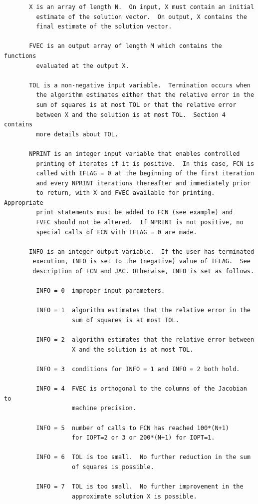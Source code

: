 \documentclass[11pt,twoside]{article}
\begin{document}
\begin{verbatim}
       X is an array of length N.  On input, X must contain an initial
         estimate of the solution vector.  On output, X contains the
         final estimate of the solution vector.

       FVEC is an output array of length M which contains the functions
         evaluated at the output X.

       TOL is a non-negative input variable.  Termination occurs when
         the algorithm estimates either that the relative error in the
         sum of squares is at most TOL or that the relative error
         between X and the solution is at most TOL.  Section 4 contains
         more details about TOL.

       NPRINT is an integer input variable that enables controlled
         printing of iterates if it is positive.  In this case, FCN is
         called with IFLAG = 0 at the beginning of the first iteration
         and every NPRINT iterations thereafter and immediately prior
         to return, with X and FVEC available for printing. Appropriate
         print statements must be added to FCN (see example) and
         FVEC should not be altered.  If NPRINT is not positive, no
         special calls of FCN with IFLAG = 0 are made.

       INFO is an integer output variable.  If the user has terminated
        execution, INFO is set to the (negative) value of IFLAG.  See
        description of FCN and JAC. Otherwise, INFO is set as follows.

         INFO = 0  improper input parameters.

         INFO = 1  algorithm estimates that the relative error in the
                   sum of squares is at most TOL.

         INFO = 2  algorithm estimates that the relative error between
                   X and the solution is at most TOL.

         INFO = 3  conditions for INFO = 1 and INFO = 2 both hold.

         INFO = 4  FVEC is orthogonal to the columns of the Jacobian to
                   machine precision.

         INFO = 5  number of calls to FCN has reached 100*(N+1)
                   for IOPT=2 or 3 or 200*(N+1) for IOPT=1.

         INFO = 6  TOL is too small.  No further reduction in the sum
                   of squares is possible.

         INFO = 7  TOL is too small.  No further improvement in the
                   approximate solution X is possible.


\end{verbatim}
\end{document}
